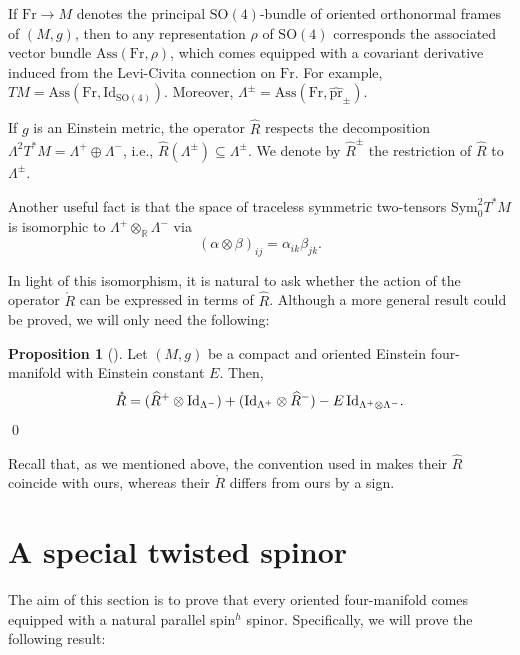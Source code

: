\documentclass[oneside,12pt]{amsart}
\theoremstyle{definition}
\newtheorem{proposition}[lemma]{Proposition}
\numberwithin{equation}{section}
\begin{document}
If $\mathrm{Fr} \to M$ denotes the principal $\mathrm{SO}(4)$-bundle of oriented orthonormal frames of $(M,g)$, then to any representation $\rho$ of $\mathrm{SO}(4)$ corresponds the associated vector bundle $\mathrm{Ass}(\mathrm{Fr} ,\rho)$, which comes equipped with a covariant derivative induced from the Levi-Civita connection on $\mathrm{Fr}$. For example, $TM = \mathrm{Ass}(\mathrm{Fr},\mathrm{Id}_{\mathrm{SO}(4)})$. Moreover, $\Lambda^{\pm} = \mathrm{Ass}(\mathrm{Fr}, \widehat{\mathrm{pr}}_{\pm})$. 


If $g$ is an Einstein metric, the operator $\widehat{R}$ respects the decomposition $\Lambda^2 T^*M = \Lambda^+ \oplus \Lambda^-$, i.e., $\widehat{R}(\Lambda^{\pm}) \subseteq \Lambda^{\pm}$. We denote by $\widehat{R}^{\pm}$ the restriction of $\widehat{R}$ to $\Lambda^{\pm}$. 

Another useful fact is that the space of traceless symmetric two-tensors $\mathrm{Sym}_0^2 T^*M$ is isomorphic to $\Lambda^+ \otimes_{\mathbb{R}} \Lambda^-$ via 
\begin{equation}\label{eq:sym_lambda}
(\alpha \otimes \beta)_{ij} = \alpha_{ik} \beta_{jk} . 
\end{equation}

In light of this isomorphism, it is natural to ask whether the action of the operator $\mathring{R}$ can be expressed in terms of $\widehat{R}$. Although a more general result could be proved, we will only need the following:  

\begin{proposition}[{\cite[Thm. 1.8]{CGT}}] \label{prop:rcirc}
    Let $(M,g)$ be a compact and oriented Einstein four-manifold with Einstein constant $E$. Then, 
    \[
    \mathring{R} =  (\widehat{R}^+ \otimes \mathrm{Id}_{\Lambda^-}) + (\mathrm{Id}_{\Lambda^+} \otimes \widehat{R}^-) - E \, \mathrm{Id}_{\Lambda^+ \otimes \Lambda^-} . \hfill 
    \] \qed
\end{proposition}

Recall that, as we mentioned above, the convention used in \cite{CGT} makes their $\widehat{R}$ coincide with ours, whereas their $\mathring{R}$ differs from ours by a sign.


\section{A special twisted spinor} \label{sec:spin}

The aim of this section is to prove that every oriented four-manifold comes equipped with a natural parallel spin$^h$ spinor. Specifically, we will prove the following result: 
\end{document}
